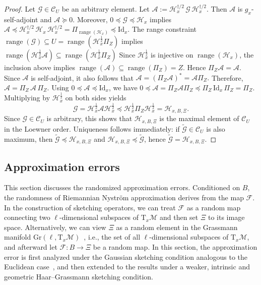 \documentclass[final,onefignum,onetabnum]{siamart250211}
\begin{document}
\begin{proof}
  Let $\mathcal{G}\in\mathcal C_U$ be an arbitrary element.
  Let
  $
  \mathcal{A}:=\mathcal{H}_x^{\dagger/2}\,\mathcal{G}\,\mathcal{H}_x^{\dagger/2}.
  $
  Then $\mathcal{A}$ is $g_x$-self-adjoint and $\mathcal{A}\succeq 0$. Moreover,
  $0 \preceq \mathcal{G} \preceq \mathcal{H}_x$ implies
  $
  \mathcal{A}
  \preceq
  \mathcal{H}_x^{\dagger/2}\,\mathcal{H}_x\,\mathcal{H}_x^{\dagger/2}
  =
  \Pi_{\operatorname{range}(\mathcal{H}_x)}
  \preceq
  \mathrm{Id}_x.
  $
  The range constraint $\operatorname{range}(\mathcal{G})\subseteq U=\operatorname{range}(\mathcal{H}_x^{\frac{1}{2}}\Pi_Z)$ implies
  $
  \operatorname{range}(\mathcal{H}_x^{\frac{1}{2}}\mathcal{A})\subseteq \operatorname{range}(\mathcal{H}_x^{\frac{1}{2}}\Pi_Z)
  $
  Since $\mathcal{H}_x^{\frac{1}{2}}$ is injective on $\operatorname{range}(\mathcal{H}_x)$, the inclusion above implies
  $
  \operatorname{range}(\mathcal{A})\subseteq \operatorname{range}(\Pi_Z)=Z.
  $
  Hence $\Pi_Z\mathcal{A}=\mathcal{A}$. Since $\mathcal{A}$ is self-adjoint, it also follows that
  $
  \mathcal{A}=(\Pi_Z\mathcal{A})^*=\mathcal{A}\Pi_Z.
  $
  Therefore,
  $
  \mathcal{A}=\Pi_Z\,\mathcal{A}\,\Pi_Z.
  $
  Using $0\preceq \mathcal{A}\preceq \mathrm{Id}_x$, we have
  $
  0\preceq \mathcal{A}=\Pi_Z\mathcal{A}\Pi_Z\preceq \Pi_Z\,\mathrm{Id}_x\,\Pi_Z=\Pi_Z.
  $
  Multiplying by $\mathcal{H}_x^{\frac{1}{2}}$ on both sides yields
  \[
  \mathcal{G}=\mathcal{H}_x^{\frac{1}{2}}\mathcal{A}\mathcal{H}_x^{\frac{1}{2}}
  \preceq
  \mathcal{H}_x^{\frac{1}{2}}\Pi_Z\mathcal{H}_x^{\frac{1}{2}}
  =\mathcal{H}_{x,B,\Xi}.
  \]
  Since $\mathcal{G}\in\mathcal C_U$ is arbitrary, this shows that $\mathcal{H}_{x,B,\Xi}$ is the maximal element of $\mathcal C_U$ in the Loewner order.
  Uniqueness follows immediately: if $\widetilde{\mathcal{G}}\in\mathcal C_U$ is also maximum, then
  $\widetilde{\mathcal{G}}\preceq \mathcal{H}_{x,B,\Xi}$ and $\mathcal{H}_{x,B,\Xi}\preceq \widetilde{\mathcal{G}}$, hence $\widetilde{\mathcal{G}}=\mathcal{H}_{x,B,\Xi}$.
  \end{proof}


\subsection{Approximation errors}
This section discusses the randomized approximation errors.
Conditioned on $B$, the randomness of Riemannian Nystr\"om approximation derives from the map $\mathcal{F}$. In the construction of sketching operators, we can treat $\mathcal{F}$ as a random map connecting two $\ell$-dimensional subspaces of $\mathrm{T}_x \mathcal{M}$ and then set $\Xi$ to its image space. Alternatively, we can view $\Xi$ as a random element in the Grassmann manifold $\mathrm{Gr}(\ell, \mathrm{T}_x \mathcal{M})$~\cite{bendokat2024grassmann}, i.e., the set of all $\ell$-dimensional subspaces of $\mathrm{T}_x \mathcal{M}$, and afterward let $\mathcal{F}: B \to \Xi$ be a random map.
In this section, the approximation error is first analyzed under the Gaussian sketching condition analogous to the Euclidean case~\cite{martinsson2020randomized}, and then extended to the results under a weaker, intrinsic and geometric Haar--Grassmann sketching condition.
\end{document}
